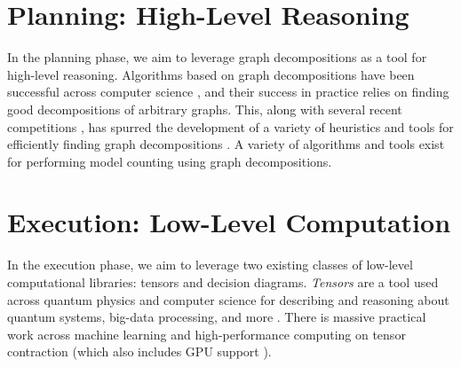 




\section{Planning: High-Level Reasoning}
In the planning phase, we aim to leverage graph decompositions as a tool for high-level reasoning.
Algorithms based on graph decompositions have been successful across computer science \cite{GLST17,MPPV04}, and their success in practice relies on finding good decompositions of arbitrary graphs. 
This, along with several recent competitions \cite{DKTW18}, has spurred the development of a variety of heuristics and tools for efficiently finding graph decompositions \cite{AMW17,HS18,Tamaki17,hicks02}. 
A variety of algorithms \cite{FMR08,SS10} and tools \cite{CW16,FHMW17,FHWZ18,FHZ19} exist for performing model counting using graph decompositions.

\section{Execution: Low-Level Computation}
In the execution phase, we aim to leverage two existing classes of low-level computational libraries: tensors and decision diagrams. 
\emph{Tensors} are a tool used across quantum physics and computer science for describing and reasoning about quantum systems, big-data processing, and more \cite{BB17,Cichocki14,Orus19}. 
There is massive practical work across machine learning and high-performance computing on tensor contraction \cite{BK07,Hirata03,KKCLA17,VZTGDMVAC18} (which also includes GPU support \cite{KSTKPPRS19,NRBHHJN15}).


